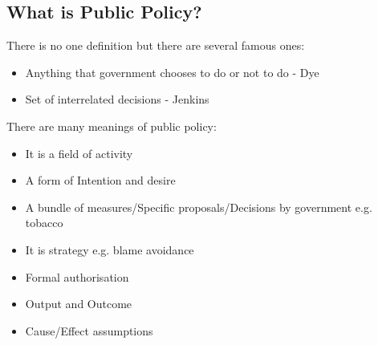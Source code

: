 \documentclass[12pt, letterpaper]{article}
\begin{document}
{\subsection{What is Public Policy?}
There is no one definition but there are several famous ones:
\begin{itemize}
	\item Anything that government chooses to do or not to do - Dye
	\item Set of interrelated decisions - Jenkins
\end{itemize}
There are many meanings of public policy:
\begin{itemize}
	\item It is a field of activity
	\item A form of Intention and desire
	\item A bundle of measures/Specific proposals/Decisions by government e.g. tobacco
	\item It is strategy e.g. blame avoidance
	\item Formal authorisation
	\item Output and Outcome
	\item Cause/Effect assumptions
\end{itemize}

}
\end{document}
